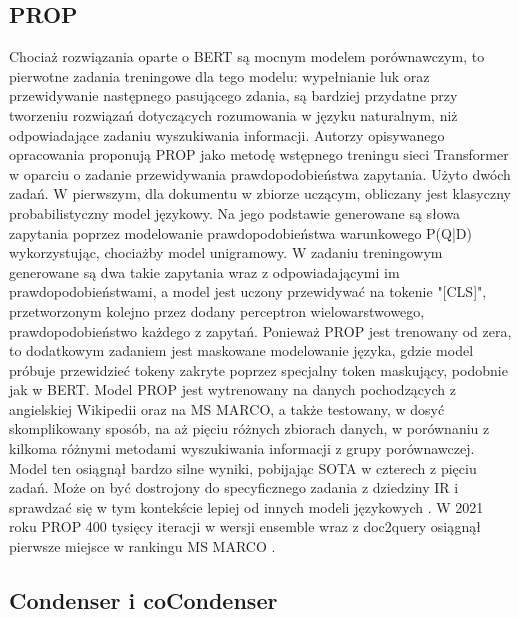 \subsection{PROP}

Chociaż rozwiązania oparte o BERT są mocnym modelem porównawczym, to pierwotne
zadania treningowe dla tego modelu: wypełnianie luk oraz przewidywanie następnego pasującego
zdania, są bardziej przydatne przy tworzeniu rozwiązań dotyczących rozumowania w języku
naturalnym, niż odpowiadające zadaniu wyszukiwania informacji. Autorzy opisywanego opracowania
proponują PROP jako metodę wstępnego treningu sieci Transformer w oparciu o zadanie
przewidywania prawdopodobieństwa zapytania. Użyto dwóch zadań. W pierwszym, dla dokumentu w
zbiorze uczącym, obliczany jest klasyczny probabilistyczny model językowy. Na jego podstawie
generowane są słowa zapytania poprzez modelowanie prawdopodobieństwa warunkowego P(Q|D)
wykorzystując, chociażby model unigramowy. W zadaniu treningowym generowane są dwa takie
zapytania wraz z odpowiadającymi im prawdopodobieństwami, a model jest uczony przewidywać na
tokenie "[CLS]", przetworzonym kolejno przez dodany perceptron wielowarstwowego,
prawdopodobieństwo każdego z zapytań. Ponieważ PROP jest trenowany od zera, to dodatkowym
zadaniem jest maskowane modelowanie języka, gdzie model próbuje przewidzieć tokeny zakryte
poprzez specjalny token maskujący, podobnie jak w BERT. Model PROP jest wytrenowany na danych
pochodzących z angielskiej Wikipedii oraz na MS MARCO, a także testowany, w dosyć skomplikowany
sposób, na aż pięciu różnych zbiorach danych, w porównaniu z kilkoma różnymi metodami
wyszukiwania informacji z grupy porównawczej. Model ten osiągnął bardzo silne wyniki, pobijając
SOTA w czterech z pięciu zadań. Może on być dostrojony do specyficznego zadania z dziedziny IR i
sprawdzać się w tym kontekście lepiej od innych modeli językowych \autocite{ma2021prop}. W 2021 roku PROP 400 tysięcy
iteracji w wersji ensemble wraz z doc2query osiągnął pierwsze miejsce w rankingu MS MARCO \autocite{albertma-prop}.

\subsection{Condenser i coCondenser}


